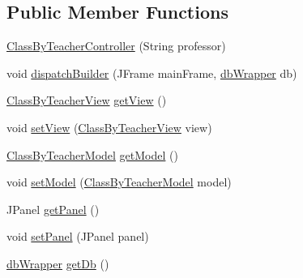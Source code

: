 \subsection*{Public Member Functions}
\begin{DoxyCompactItemize}
\item 
\mbox{\hyperlink{classcom_1_1_b_n_u_1_1pages_1_1classes_by_teacher_1_1_class_by_teacher_controller_a19bb27ecb80a1fb9f919c6d6a500c2ab}{Class\+By\+Teacher\+Controller}} (String professor)
\item 
void \mbox{\hyperlink{classcom_1_1_b_n_u_1_1pages_1_1classes_by_teacher_1_1_class_by_teacher_controller_a17ece39ddb96b03ca24ef8309ba78763}{dispatch\+Builder}} (J\+Frame main\+Frame, \mbox{\hyperlink{interfacecom_1_1_b_n_u_1_1database_1_1db_wrapper}{db\+Wrapper}} db)
\item 
\mbox{\hyperlink{classcom_1_1_b_n_u_1_1pages_1_1classes_by_teacher_1_1_class_by_teacher_view}{Class\+By\+Teacher\+View}} \mbox{\hyperlink{classcom_1_1_b_n_u_1_1pages_1_1classes_by_teacher_1_1_class_by_teacher_controller_a4967ee0c43a4feccead845d8c72ed99a}{get\+View}} ()
\item 
void \mbox{\hyperlink{classcom_1_1_b_n_u_1_1pages_1_1classes_by_teacher_1_1_class_by_teacher_controller_af63a7ca452e8871a40711d0d4dd03e8b}{set\+View}} (\mbox{\hyperlink{classcom_1_1_b_n_u_1_1pages_1_1classes_by_teacher_1_1_class_by_teacher_view}{Class\+By\+Teacher\+View}} view)
\item 
\mbox{\hyperlink{classcom_1_1_b_n_u_1_1pages_1_1classes_by_teacher_1_1_class_by_teacher_model}{Class\+By\+Teacher\+Model}} \mbox{\hyperlink{classcom_1_1_b_n_u_1_1pages_1_1classes_by_teacher_1_1_class_by_teacher_controller_a6d11acd28c9ba9843259369eb8733723}{get\+Model}} ()
\item 
void \mbox{\hyperlink{classcom_1_1_b_n_u_1_1pages_1_1classes_by_teacher_1_1_class_by_teacher_controller_a6f8c58f4994e84754393bcd4a1786af5}{set\+Model}} (\mbox{\hyperlink{classcom_1_1_b_n_u_1_1pages_1_1classes_by_teacher_1_1_class_by_teacher_model}{Class\+By\+Teacher\+Model}} model)
\item 
J\+Panel \mbox{\hyperlink{classcom_1_1_b_n_u_1_1pages_1_1classes_by_teacher_1_1_class_by_teacher_controller_a305d602fd564b5770c0eebe853462214}{get\+Panel}} ()
\item 
void \mbox{\hyperlink{classcom_1_1_b_n_u_1_1pages_1_1classes_by_teacher_1_1_class_by_teacher_controller_aa4b950d16d2a170d6a0b1bc3174ea605}{set\+Panel}} (J\+Panel panel)
\item 
\mbox{\hyperlink{interfacecom_1_1_b_n_u_1_1database_1_1db_wrapper}{db\+Wrapper}} \mbox{\hyperlink{classcom_1_1_b_n_u_1_1pages_1_1classes_by_teacher_1_1_class_by_teacher_controller_a27e21769ce4da390523285b0da4af588}{get\+Db}} ()

\end{DoxyCompactItemize}
